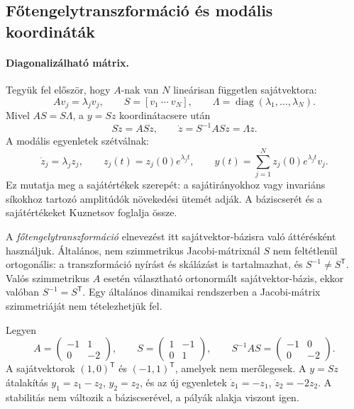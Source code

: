 \subsection{Főtengelytranszformáció és modális koordináták}
\paragraph*{Diagonalizálható mátrix.}
Tegyük fel először, hogy $A$-nak van $N$ lineárisan független sajátvektora:
\[
Av_j=\lambda_jv_j,\qquad
S=[v_1\ \cdots\ v_N],\qquad
\Lambda=\operatorname{diag}(\lambda_1,\ldots,\lambda_N).
\]
Mivel $AS=S\Lambda$, a $y=Sz$ koordinátacsere után
\begin{equation}\label{eq:modal_transform}
S\dot z=ASz,\qquad
\dot z=S^{-1}ASz=\Lambda z.
\end{equation}
A modális egyenletek szétválnak:
\begin{equation}\label{eq:modal_solution}
\dot z_j=\lambda_jz_j,\qquad
z_j(t)=z_j(0)e^{\lambda_jt},\qquad
y(t)=\sum_{j=1}^{N}z_j(0)e^{\lambda_jt}v_j.
\end{equation}
Ez mutatja meg a sajátértékek szerepét: a sajátirányokhoz vagy invariáns síkokhoz tartozó amplitúdók növekedési ütemét adják. A báziscserét és a sajátértékeket Kuznetsov \cite[A.1.2--A.1.3. szakasz]{kuznetsov_book} foglalja össze.

A \emph{főtengelytranszformáció} elnevezést itt sajátvektor-bázisra való áttérésként használjuk. Általános, nem szimmetrikus Jacobi-mátrixnál $S$ nem feltétlenül ortogonális: a transzformáció nyírást és skálázást is tartalmazhat, és $S^{-1}\neq S^\mathsf T$. Valós szimmetrikus $A$ esetén választható ortonormált sajátvektor-bázis, ekkor valóban $S^{-1}=S^\mathsf T$. Egy általános dinamikai rendszerben a Jacobi-mátrix szimmetriáját nem tételezhetjük fel.

Legyen
\begin{equation}\label{eq:nonorthogonal_example}
A=\begin{pmatrix}-1&1\\0&-2\end{pmatrix},\qquad
S=\begin{pmatrix}1&-1\\0&1\end{pmatrix},\qquad
S^{-1}AS=\begin{pmatrix}-1&0\\0&-2\end{pmatrix}.
\end{equation}
A sajátvektorok $(1,0)^\mathsf T$ és $(-1,1)^\mathsf T$, amelyek nem merőlegesek. A $y=Sz$ átalakítás $y_1=z_1-z_2$, $y_2=z_2$, és az új egyenletek $\dot z_1=-z_1$, $\dot z_2=-2z_2$. A stabilitás nem változik a báziscserével, a pályák alakja viszont igen.
\exampleend


